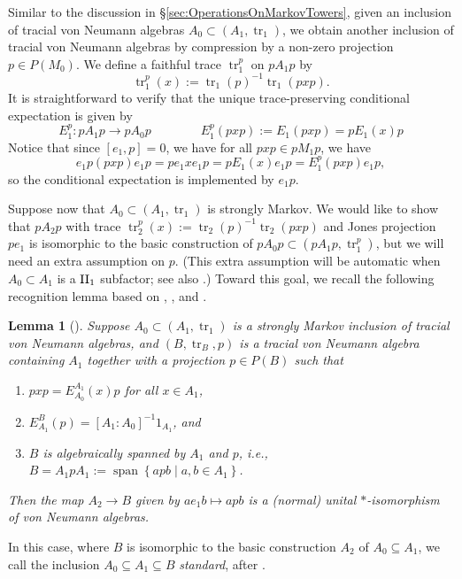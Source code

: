 \documentclass[11pt]{article}
\theoremstyle{plain}
\newtheorem{lem}[thm]{Lemma}
\theoremstyle{definition}
\DeclareMathOperator{\spann}{span}
\DeclareMathOperator{\tr}{tr}
\newcommand{\set}[2]{\left\{#1 \middle| #2\right\}}
\begin{document}
Similar to the discussion in \S\ref{sec:OperationsOnMarkovTowers}, 
given an inclusion of tracial von Neumann algebras $A_0\subset (A_1, \tr_1)$, we obtain another inclusion of tracial von Neumann algebras by compression by a non-zero projection $p\in P(M_0)$.
We define a faithful trace $\tr_1^p$ on $pA_1 p$ by
\begin{equation}
\label{eq:CompressedTrace1}
\tr^p_1(x) := \tr_1(p)^{-1}\tr_1(pxp).
\end{equation}
It is straightforward to verify that the unique trace-preserving conditional expectation is given by 
\begin{equation}
\label{eq:CompressedConditionalExpectation1}
E^p_1 : pA_1p \to pA_{0}p
\qquad
\qquad
E^p_1(pxp) := E_1(pxp) = pE_1(x)p
\end{equation}
Notice that since $[e_1,p] = 0$, we have for all $pxp \in pM_1 p$, we have 
\begin{equation}
\label{eq:CompressionImplementsConditionalExpectation1}
e_1p (pxp) e_1p = p e_1xe_1p = pE_1(x)e_1p = E_1^p(pxp)e_1p,
\end{equation}
so the conditional expectation is implemented by $e_1p$.

Suppose now that $A_0 \subset (A_1, \tr_1)$ is strongly Markov.
We would like to show that $pA_2p$ with trace $\tr^p_2(x):=\tr_2(p)^{-1}\tr_2(pxp)$ and Jones projection $pe_1$
is isomorphic to the basic construction of $pA_0p \subset (pA_1p, \tr_1^p)$, but we will need an extra assumption on $p$.
(This extra assumption will be automatic when $A_0 \subset A_1$ is a ${\rm II}_1$ subfactor; see also \cite[Lem.~2.4]{MR1262294}.)
Toward this goal, we recall the following recognition lemma based on \cite[Prop.~1.2]{MR965748}, \cite[Lem.~5.8]{MR1073519}, and \cite[Lem.~5.3.1]{MR1473221}.

\begin{lem}[{\cite[Lem.~2.15]{MR2812459}}]
\label{lem:BasicConstructionRecognition}
Suppose $A_0 \subset (A_1, \tr_1)$ is a strongly Markov inclusion of tracial von Neumann algebras, and $(B, \tr_B, p)$ is a tracial von Neumann algebra containing $A_1$ together with a projection $p\in P(B)$ such that
\begin{enumerate}[label={\rm(R\arabic*)}]
\item
\label{eq:RecognitionImplement}
$pxp = E_{A_0}^{A_1}(x)p$ for all $x\in A_1$,
\item
\label{eq:RecognitionMarkov}
$E^{B}_{A_1}(p) = [A_1:A_0]^{-1} 1_{A_1}$, and
\item
\label{eq:RecognitionSpan}
$B$ is algebraically spanned by $A_1$ and $p$, i.e., $B = A_1pA_1 := \spann\set{apb}{a,b\in A_1}$.
\end{enumerate}
Then the map $A_2\to B$ given by $ae_1b \mapsto apb$ is a (normal) unital $*$-isomorphism of von Neumann algebras.
\end{lem}
In this case, where $B$ is isomorphic to the basic construction $A_2$ of $A_0\subseteq A_1$, we call the inclusion $A_0\subseteq A_1\subseteq B$ \textit{standard}, after \cite{MR2812459}. 
\end{document}
